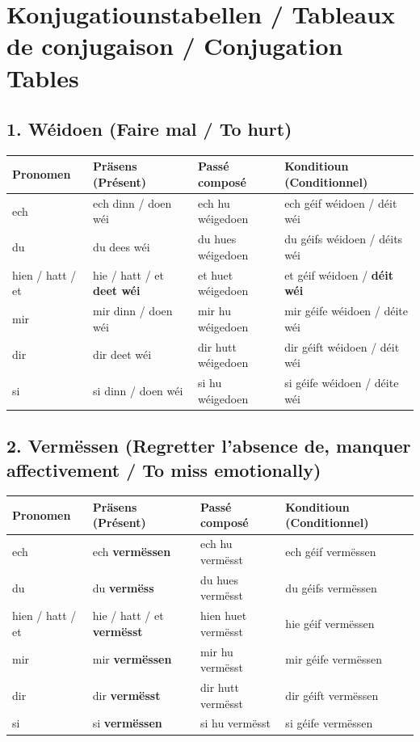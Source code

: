 \vspace{1.5em}

\section[Konjugatiounstabellen / Conjugation Tables]{Konjugatiounstabellen / Tableaux de conjugaison / Conjugation Tables}

\subsection*{1. Wéidoen (Faire mal / To hurt)}
\begin{center}
\begin{tabular}{llll}
\toprule
\textbf{Pronomen} & \textbf{Präsens (Présent)} & \textbf{Passé composé} & \textbf{Konditioun (Conditionnel)} \\
\midrule
ech & ech dinn / doen wéi & ech hu wéigedoen & ech géif wéidoen / déit wéi \\
du & du dees wéi & du hues wéigedoen & du géifs wéidoen / déits wéi \\
hien / hatt / et & hie / hatt / et \textbf{deet wéi} & et huet wéigedoen & et géif wéidoen / \textbf{déit wéi} \\
mir & mir dinn / doen wéi & mir hu wéigedoen & mir géife wéidoen / déite wéi \\
dir & dir deet wéi & dir hutt wéigedoen & dir géift wéidoen / déit wéi \\
si & si dinn / doen wéi & si hu wéigedoen & si géife wéidoen / déite wéi \\
\bottomrule
\end{tabular}
\end{center}

\vspace{1em}

\subsection*{2. Vermëssen (Regretter l'absence de, manquer affectivement / To miss emotionally)}
\begin{center}
\begin{tabular}{llll}
\toprule
\textbf{Pronomen} & \textbf{Präsens (Présent)} & \textbf{Passé composé} & \textbf{Konditioun (Conditionnel)} \\
\midrule
ech & ech \textbf{vermëssen} & ech hu vermësst & ech géif vermëssen \\
du & du \textbf{vermëss} & du hues vermësst & du géifs vermëssen \\
hien / hatt / et & hie / hatt / et \textbf{vermësst} & hien huet vermësst & hie géif vermëssen \\
mir & mir \textbf{vermëssen} & mir hu vermësst & mir géife vermëssen \\
dir & dir \textbf{vermësst} & dir hutt vermësst & dir géift vermëssen \\
si & si \textbf{vermëssen} & si hu vermësst & si géife vermëssen \\
\bottomrule
\end{tabular}
\end{center}

